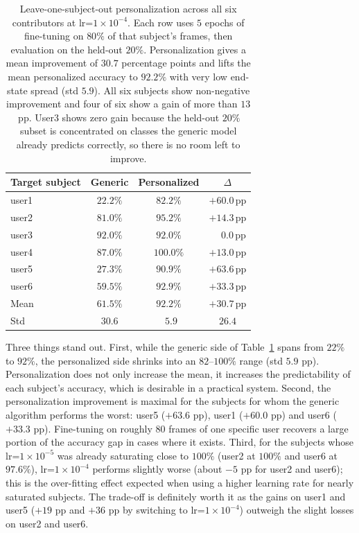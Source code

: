 \documentclass[12pt,a4paper]{article}
\begin{document}
\begin{table}[H]
  \centering
  \footnotesize
  \begin{tabular}{lccc}
    \toprule
    Target subject & Generic & Personalized & $\Delta$ \\
    \midrule
    user1 & $22.2\%$ & $82.2\%$  & $+60.0$\,pp \\
    user2 & $81.0\%$ & $95.2\%$  & $+14.3$\,pp \\
    user3 & $92.0\%$ & $92.0\%$  & $\phantom{+}0.0$\,pp \\
    user4 & $87.0\%$ & $100.0\%$ & $+13.0$\,pp \\
    user5 & $27.3\%$ & $90.9\%$  & $+63.6$\,pp \\
    user6 & $59.5\%$ & $92.9\%$  & $+33.3$\,pp \\
    \midrule
    Mean  & $\mathbf{61.5\%}$ & $\mathbf{92.2\%}$ & $\mathbf{+30.7}$\,pp \\
    Std   & $30.6$ & $\phantom{0}5.9$ & $26.4$ \\
    \bottomrule
  \end{tabular}
  \caption{\footnotesize Leave-one-subject-out personalization across all
  six contributors at lr=$1\times 10^{-4}$. Each row uses $5$
  epochs of fine-tuning on $80\%$ of that subject's frames,
  then evaluation on the held-out $20\%$. Personalization
  gives a mean improvement of $30.7$ percentage points and
  lifts the mean personalized accuracy to $92.2\%$ with very
  low end-state spread (std $5.9$). All six subjects show
  non-negative improvement and four of six show a gain of
  more than $13$\,pp. User3 shows zero gain because the
  held-out $20\%$ subset is concentrated on classes the
  generic model already predicts correctly, so there is no
  room left to improve.}
  \label{tab:beta}
\end{table}

Three things stand out. First, while the generic side of Table~\ref{tab:beta}
spans from $22\%$ to $92\%$, the personalized side
shrinks into an $82$--$100\%$ range (std $5.9$ pp).
Personalization does not only increase the mean,
it increases the predictability of each subject's accuracy,
which is desirable in a practical system. Second, the personalization improvement is maximal for the subjects
for whom the generic algorithm performs the worst:
user5 ($+63.6$ pp), user1 ($+60.0$ pp) and user6 ($+33.3$ pp).
Fine-tuning on roughly $80$ frames of one specific user
recovers a large portion of the accuracy gap in cases
where it exists. Third, for the subjects whose lr=$1\times 10^{-5}$
was already saturating close to $100\%$
(user2 at $100\%$ and user6 at $97.6\%$),
lr=$1\times 10^{-4}$ performs slightly worse (about $-5$ pp for
user2 and user6); this is the over-fitting effect expected
when using a higher learning rate for nearly saturated subjects.
The trade-off is definitely worth it as the gains on user1 and user5
($+19$ pp and $+36$ pp by switching to lr=$1\times 10^{-4}$)
outweigh the slight losses on user2 and user6.
\end{document}
